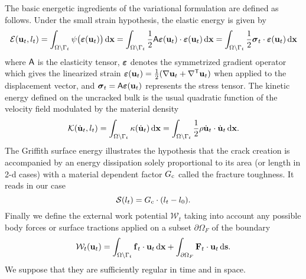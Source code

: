 The basic energetic ingredients of the variational formulation are defined as follows. Under the small strain hypothesis, the elastic energy is given by
\begin{equation} \label{eq:elastic}
\mathcal{E}(\vec{u}_t,l_t)=\int_\domaint\psi\bigl(\eps(\vec{u}_t)\bigr)\dx=\int_\domaint\frac{1}{2}\tens{A}\eps(\vec{u}_t)\cdot\eps(\vec{u}_t)\dx=\int_\domaint\frac{1}{2}\sig_t\cdot\eps(\vec{u}_t)\dx
\end{equation}
where $\mathsf{A}$ is the elasticity tensor, $\eps$ denotes the symmetrized gradient operator which gives the linearized strain $\eps(\vec{u}_t)=\frac{1}{2}(\nabla\vec{u}_t+\nabla^\mT\vec{u}_t)$ when applied to the displacement vector, and $\sig_t=\tens{A}\eps(\vec{u}_t)$ represents the stress tensor. The kinetic energy defined on the uncracked bulk is the usual quadratic function of the velocity field modulated by the material density
\begin{equation} \label{eq:kinetic}
\mathcal{K}(\dot{\vec{u}}_t,l_t)=\int_\domaint\kappa(\dot{\vec{u}}_t)\dx=\int_\domaint\frac{1}{2}\rho\dot{\vec{u}}_t\cdot\dot{\vec{u}}_t\dx.
\end{equation}
The Griffith surface energy \cite{Griffith:1921} illustrates the hypothesis that the crack creation is accompanied by an energy dissipation solely proportional to its area (or length in 2-d cases) with a material dependent factor $G_\mathrm{c}$ called the fracture toughness. It reads in our case
\begin{equation} \label{eq:griffith}
\mathcal{S}(l_t)=G_\mathrm{c}\cdot(l_t-l_0).
\end{equation}
Finally we define the external work potential $\mathcal{W}_t$ taking into account any possible body forces or surface tractions applied on a subset ${\partial\Omega_F}$ of the boundary
\begin{equation} \label{eq:externalwork}
\mathcal{W}_t(\vec{u}_t)=\int_\domaint \vec{f}_t\cdot\vec{u}_t\dx+\int_{\partial\Omega_F} \vec{F}_t\cdot\vec{u}_t\D{\vec{s}}.
\end{equation}
We suppose that they are sufficiently regular in time and in space.

